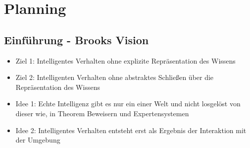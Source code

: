\documentclass{article} %
\begin{document}
\section{Planning}
	\subsection{Einführung - Brooks Vision}
	\begin{itemize}
		\item Ziel 1: Intelligentes Verhalten ohne explizite Repräsentation des Wissens
		\item Ziel 2: Intelligenten Verhalten ohne abstraktes Schließen über die Repräsentation des Wissens
		\item Idee 1: Echte Intelligenz gibt es nur ein einer Welt und nicht losgelöst von dieser wie, in Theorem Beweisern und Expertensystemen
		\item Idee 2: Intelligentes Verhalten entsteht erst als Ergebnis der Interaktion mit der Umgebung
	\end{itemize}
\end{document}
